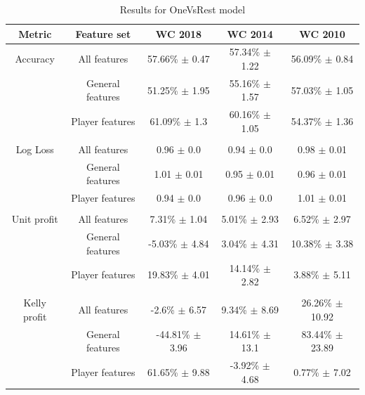 \begin{table}
    \caption{Results for OneVsRest model}
    \begin{tabular}{| c  c| c| c| c|}
        \hline
        Metric& Feature set & \textbf{WC 2018} & \textbf{WC 2014} & \textbf{WC 2010}\\
        \hline
        Accuracy & All features & 57.66\% $\pm$ 0.47 & 57.34\% $\pm$ 1.22 & 56.09\% $\pm$ 0.84 \\
 & General features & 51.25\% $\pm$ 1.95 & 55.16\% $\pm$ 1.57 & 57.03\% $\pm$ 1.05 \\
 & Player features & 61.09\% $\pm$ 1.3 & 60.16\% $\pm$ 1.05 & 54.37\% $\pm$ 1.36 \\
 &  & & &  \\
Log Loss & All features & 0.96 $\pm$ 0.0 & 0.94 $\pm$ 0.0 & 0.98 $\pm$ 0.01 \\
 & General features & 1.01 $\pm$ 0.01 & 0.95 $\pm$ 0.01 & 0.96 $\pm$ 0.01 \\
 & Player features & 0.94 $\pm$ 0.0 & 0.96 $\pm$ 0.0 & 1.01 $\pm$ 0.01 \\
 &  & & &  \\
Unit profit & All features & 7.31\% $\pm$ 1.04 & 5.01\% $\pm$ 2.93 & 6.52\% $\pm$ 2.97 \\
 & General features & -5.03\% $\pm$ 4.84 & 3.04\% $\pm$ 4.31 & 10.38\% $\pm$ 3.38 \\
 & Player features & 19.83\% $\pm$ 4.01 & 14.14\% $\pm$ 2.82 & 3.88\% $\pm$ 5.11 \\
 &  & & &  \\
Kelly profit & All features & -2.6\% $\pm$ 6.57 & 9.34\% $\pm$ 8.69 & 26.26\% $\pm$ 10.92 \\
 & General features & -44.81\% $\pm$ 3.96 & 14.61\% $\pm$ 13.1 & 83.44\% $\pm$ 23.89 \\
 & Player features & 61.65\% $\pm$ 9.88 & -3.92\% $\pm$ 4.68 & 0.77\% $\pm$ 7.02 \\
 \hline
    \end{tabular}
    \label{table:onevsrestresults}
\end{table}

